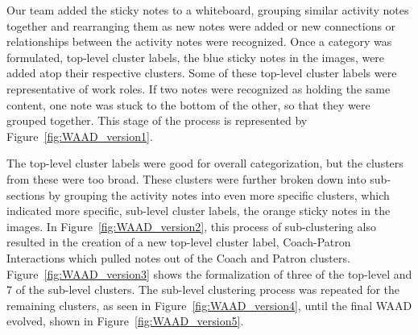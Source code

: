 \documentclass[12pt]{article} %
\begin{document}
  Our team added the sticky notes to a whiteboard, grouping similar activity notes together and rearranging them as new notes were added or new connections or relationships between the activity notes were recognized.
  Once a category was formulated, top-level cluster labels, the blue sticky notes in the images, were added atop their respective clusters.
  Some of these top-level cluster labels were representative of work roles.
  If two notes were recognized as holding the same content, one note was stuck to the bottom of the other, so that they were grouped together.
  This stage of the process is represented by Figure~\ref{fig:WAAD_version1}. 

  The top-level cluster labels were good for overall categorization, but the clusters from these were too broad.
  These clusters were further broken down into sub-sections by grouping the activity notes into even more specific clusters, which indicated more specific, sub-level cluster labels, the orange sticky notes in the images.
  In Figure~\ref{fig:WAAD_version2}, this process of sub-clustering also resulted in the creation of a new top-level cluster label, Coach-Patron Interactions which pulled notes out of the Coach and Patron clusters.
  Figure~\ref{fig:WAAD_version3} shows the formalization of three of the top-level and 7 of the sub-level clusters.
  The sub-level clustering process was repeated for the remaining clusters, as seen in Figure~\ref{fig:WAAD_version4}, until the final WAAD evolved, shown in Figure~\ref{fig:WAAD_version5}.
\end{document}
